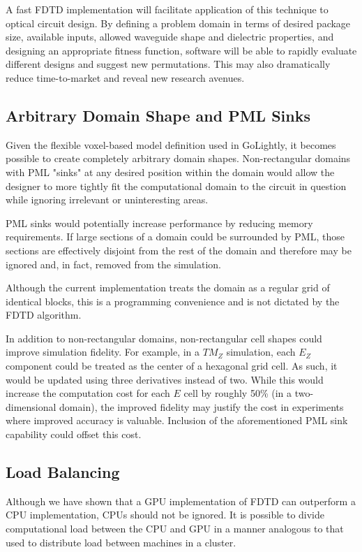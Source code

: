 A fast FDTD implementation will facilitate application of this technique to optical circuit design. By defining a problem domain in terms of desired package size, available inputs, allowed waveguide shape and dielectric properties, and designing an appropriate fitness function, software will be able to rapidly evaluate different designs and suggest new permutations. This may also dramatically reduce time-to-market and reveal new research avenues. 


\subsection{Arbitrary Domain Shape and PML Sinks}
Given the flexible voxel-based model definition used in GoLightly, it becomes possible to create completely arbitrary domain shapes. Non-rectangular domains with PML "sinks" at any desired position within the domain would allow the designer to more tightly fit the computational domain to the circuit in question while ignoring irrelevant or uninteresting areas.

PML sinks would potentially increase performance by reducing memory requirements. If large sections of a domain could be surrounded by PML, those sections are effectively disjoint from the rest of the domain and therefore may be ignored and, in fact, removed from the simulation. 

Although the current implementation treats the domain as a regular grid of identical blocks, this is a programming convenience and is not dictated by the FDTD algorithm.

In addition to non-rectangular domains, non-rectangular cell shapes could improve simulation fidelity. For example, in a $TM_Z$ simulation, each $E_Z$ component could be treated as the center of a hexagonal grid cell. As such, it would be updated using three derivatives instead of two. While this would increase the computation cost for each $E$ cell by roughly 50\% (in a two-dimensional domain), the improved fidelity may justify the cost in experiments where improved accuracy is valuable. Inclusion of the aforementioned PML sink capability could offset this cost. 

\subsection{Load Balancing}
Although we have shown that a GPU implementation of FDTD can outperform a CPU implementation, CPUs should not be ignored. It is possible to divide computational load between the CPU and GPU in a manner analogous to that used to distribute load between machines in a cluster. 


